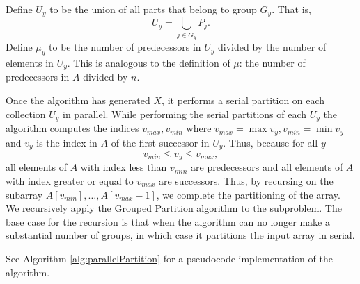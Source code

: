 \documentclass[twocolumn, twoside, 12pt]{article}
\begin{document}
Define $U_y$ to be the union of all parts that belong to group $G_y$. That is,
$$U_y = \bigcup_{j\in G_y} P_j.$$
Define $\mu_y$ to be the number of predecessors in $U_y$ divided by the number of elements in $U_y$. This is analogous to the definition of $\mu$: the number of predecessors in $A$ divided by $n$.

Once the algorithm has generated $X$, it performs a serial partition on each collection $U_y$ in parallel. 
While performing the serial partitions of each $U_y$ the algorithm computes the indices $v_{max}, v_{min}$ where $v_{max}=\max{v_y}, v_{min}=\min v_y$ and $v_y$ is the index in $A$ of the first successor in $U_y$.
Thus, because for all $y$ 
$$v_{min}\leq v_{y} \leq v_{max},$$
all elements of $A$ with index less than $v_{min}$ are predecessors and all elements of $A$ with index greater or equal to $v_{max}$ are successors.
Thus, by recursing on the subarray $A[v_{min}],\ldots,A[v_{max}-1]$, we complete the partitioning of the array.
We recursively apply the Grouped Partition algorithm to the subproblem.
The base case for the recursion is that when the algorithm can no longer make a substantial number of groups, in which case it partitions the input array in serial.

See Algorithm \ref{alg:parallelPartition} for a pseudocode implementation of the algorithm.
\end{document}
